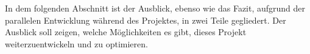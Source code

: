 \label{Ausblick}

In dem folgenden Abschnitt ist der Ausblick, ebenso wie das Fazit, aufgrund der parallelen Entwicklung während des Projektes, in zwei Teile gegliedert. Der Ausblick soll zeigen, welche Möglichkeiten es gibt, dieses Projekt weiterzuentwickeln und zu optimieren.